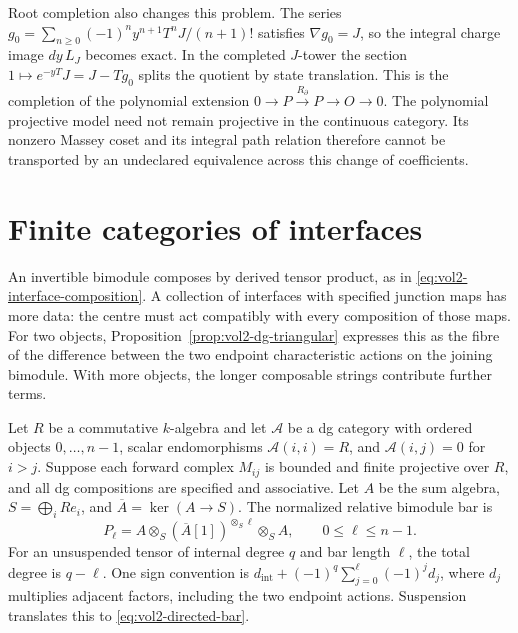 Root completion also changes this problem. The series
$g_0=\sum_{n\geq0}(-1)^ny^{n+1}T^nJ/(n+1)!$ satisfies
$\nabla g_0=J$, so the integral charge image $dy\,L_J$ becomes
exact. In the completed $J$-tower the section
$1\mapsto e^{-yT}J=J-Tg_0$ splits the quotient by state
translation. This is the completion of the polynomial
extension $0\to P\xrightarrow{R_\partial}P\to O\to0$.
The polynomial projective model need not remain projective in
the continuous category. Its nonzero Massey coset and its
integral path relation therefore cannot be transported by
an undeclared equivalence across this change of coefficients.

\section{Finite categories of interfaces}
\label{sec:vol2-finite-interface-centres}

An invertible bimodule composes by derived tensor product, as in
\eqref{eq:vol2-interface-composition}. A collection of interfaces
with specified junction maps has more data: the centre must act
compatibly with every composition of those maps. For two objects,
Proposition~\ref{prop:vol2-dg-triangular} expresses this as the fibre
of the difference between the two endpoint characteristic actions
on the joining bimodule. With more objects, the longer composable
strings contribute further terms.

Let $R$ be a commutative $k$-algebra and let $\mathcal A$ be a dg
category with ordered objects $0,\ldots,n-1$, scalar endomorphisms
$\mathcal A(i,i)=R$, and $\mathcal A(i,j)=0$ for $i>j$.
Suppose each forward complex $M_{ij}$ is bounded and finite
projective over $R$, and all dg compositions are specified and
associative. Let $A$ be the sum algebra, $S=\bigoplus_iRe_i$,
and $\overline A=\ker(A\to S)$. The normalized relative bimodule
bar is
\begin{equation}\label{eq:vol2-directed-bar}
 P_\ell=A\otimes_S(\overline A[1])^{\otimes_S\ell}\otimes_SA,
                     \qquad0\leq\ell\leq n-1.
\end{equation}
For an unsuspended tensor of internal degree $q$ and bar length
$\ell$, the total degree is $q-\ell$. One sign convention is
$d_{\mathrm{int}}+(-1)^q\sum_{j=0}^{\ell}(-1)^jd_j$, where
$d_j$ multiplies adjacent factors, including the two endpoint
actions. Suspension translates this to
\eqref{eq:vol2-directed-bar}.

